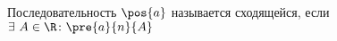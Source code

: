 
        Последовательность $\pos{a}$ называется сходящейся, если $\exists\  A\in \R\colon \pre{a}{n}{A}$
    